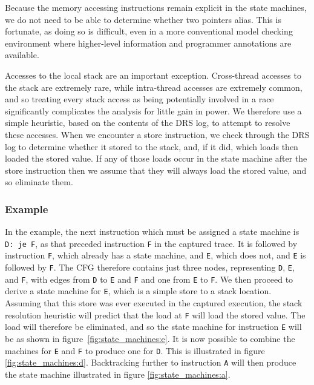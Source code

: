 \documentclass[10pt,twocolumn,preprint,natbib,authoryear]{sigplanconf}
\newcommand{\editorial}[1]{}
\newcommand{\needCite}{\editorial{need cite}}
\begin{document}
Because the memory accessing instructions remain explicit in the state
machines, we do not need to be able to determine whether two pointers
alias.  This is fortunate, as doing so is difficult, even in a more
conventional model checking environment where higher-level information
and programmer annotations are available\needCite{}.

Accesses to the local stack are an important exception.  Cross-thread
accesses to the stack are extremely rare, while intra-thread accesses
are extremely common, and so treating every stack access as being
potentially involved in a race significantly complicates the analysis
for little gain in power.  We therefore use a simple heuristic, based
on the contents of the DRS log, to attempt to resolve these accesses.
When we encounter a store instruction, we check through the DRS log to
determine whether it stored to the stack, and, if it did, which loads
then loaded the stored value.  If any of those loads occur in the
state machine after the store instruction then we assume that they
will always load the stored value, and so eliminate them.

\subsubsection{Example}

In the example, the next instruction which must be assigned a state
machine is \verb|D: je F|, as that preceded instruction \verb|F| in
the captured trace.  It is followed by instruction \verb|F|, which
already has a state machine, and \verb|E|, which does not, and
\verb|E| is followed by \verb|F|.  The CFG therefore contains just
three nodes, representing \verb|D|, \verb|E|, and \verb|F|, with edges
from \verb|D| to \verb|E| and \verb|F| and one from \verb|E| to
\verb|F|\editorial{Diagram?}.  We then proceed to derive a state
machine for \verb|E|, which is a simple store to a stack location.
Assuming that this store was ever executed in the captured execution,
the stack resolution heuristic will predict that the load at \verb|F|
will load the stored value.  The load will therefore be eliminated,
and so the state machine for instruction \verb|E| will be as shown in
figure~\ref{fig:state_machines:e}.  It is now possible to combine the
machines for \verb|E| and \verb|F| to produce one for \verb|D|.  This
is illustrated in figure \ref{fig:state_machines:d}.
Backtracking further to instruction \verb|A| will then produce the
state machine illustrated in figure \ref{fig:state_machines:a}.
\end{document}
